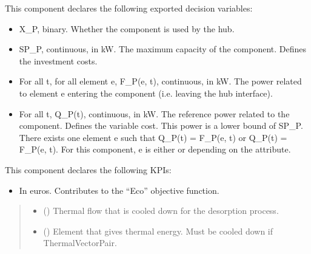 \documentclass[letterpaper,10pt,english]{sphinxmanual}
\begin{document}
\begin{fulllineitems}
\begin{fulllineitems}
\sphinxAtStartPar
This component declares the following exported decision variables:
\begin{itemize}
\item {} 
\sphinxAtStartPar
X\_P, binary.
Whether the component is used by the hub.

\item {} 
\sphinxAtStartPar
SP\_P, continuous, in kW.
The maximum capacity of the component. Defines the investment costs.

\item {} 
\sphinxAtStartPar
For all t, for all element e, F\_P(e, t), continuous, in kW.
The power related to element e entering the component (i.e. leaving the hub interface).

\item {} 
\sphinxAtStartPar
For all t, Q\_P(t), continuous, in kW.
The reference power related to the component. Defines the variable cost.
This power is a lower bound of SP\_P.
There exists one element e such that Q\_P(t) = F\_P(e, t) or Q\_P(t) = \sphinxhyphen{} F\_P(e, t).
For this component, e is either  or  depending on the  attribute.

\end{itemize}

\sphinxAtStartPar
This component declares the following KPIs:
\begin{itemize}
\item {} 
\sphinxAtStartPar
{}
In euros.
Contributes to the “Eco” objective function.

\end{itemize}
\begin{quote}\begin{description}
\begin{itemize}
\item {} 
\sphinxAtStartPar
{} () \textendash{} Thermal flow that is cooled down for the desorption process.

\item {} 
\sphinxAtStartPar
{} () \textendash{} Element that gives thermal energy.
Must be cooled down if ThermalVectorPair.


\end{itemize}
\end{description}
\end{quote}
\end{fulllineitems}
\end{fulllineitems}
\end{document}
